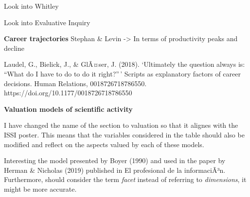 \documentclass[]{elsarticle} %
\begin{document}
Look into Whitley

Look into Evaluative Inquiry

\textbf{Career trajectories} Stephan \& Levin -\textgreater{} In terms
of productivity peaks and decline

Laudel, G., Bielick, J., \& GlÃ¤ser, J. (2018). `Ultimately the question
always is: ``What do I have to do to do it right?''\,' Scripts as
explanatory factors of career decisions. Human Relations,
0018726718786550. https://doi.org/10.1177/0018726718786550

\textbf{Valuation models of scientific activity}

I have changed the name of the section to valuation so that it alignes
with the ISSI poster. This means that the variables considered in the
table should also be modified and reflect on the aspects valued by each
of these models.

Interesting the model presented by Boyer (1990) and used in the paper by
Herman \& Nicholas (2019) published in El profesional de la
informaciÃ³n. Furthermore, should consider the term \emph{facet} instead
of referring to \emph{dimensions}, it might be more accurate.
\end{document}
